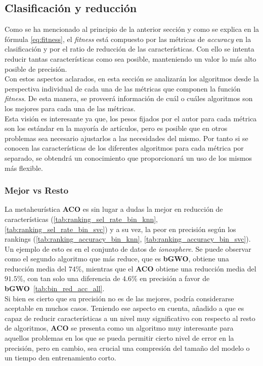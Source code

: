 \subsection{Clasificación y reducción}
Como se ha mencionado al principio de la anterior sección y como se explica en la fórmula \ref{eq:fitness}, el \textit{fitness} está compuesto por las métricas de \textit{accuracy} en la clasificación y por el ratio de reducción de las características. Con ello se intenta reducir tantas características como sea posible, manteniendo un valor lo más alto posible de precisión.\\[6pt]
Con estos aspectos aclarados, en esta sección se analizarán los algoritmos desde la perspectiva individual de cada una de las métricas que componen la función \textit{fitness}. De esta manera, se proveerá información de cuál o cuáles algoritmos son los mejores para cada una de las métricas.\\[6pt]
Esta visión es interesante ya que, los pesos fijados por el autor para cada métrica son los estándar en la mayoría de artículos, pero es posible que en otros problemas sea necesario ajustarlos a las necesidades del mismo. Por tanto si se conocen las características de los diferentes algoritmos para cada métrica por separado, se obtendrá un conocimiento que proporcionará un uso de los mismos más flexible.

\subsubsection{Mejor vs Resto}
La metaheurística \textbf{ACO} es sin lugar a dudas la mejor en reducción de características (\ref{tab:ranking_sel_rate_bin_knn}, \ref{tab:ranking_sel_rate_bin_svc}) y a su vez, la peor en precisión según los rankings (\ref{tab:ranking_accuracy_bin_knn}, \ref{tab:ranking_accuracy_bin_svc}).
Un ejemplo de esto es en el conjunto de datos de \textit{ionosphere}. Se puede observar como el segundo algoritmo que más reduce, que es \textbf{bGWO}, obtiene una reducción media del $74\%$, mientras que el \textbf{ACO} obtiene una reducción media del $91.5\%$, con tan solo una diferencia de $4.6\%$ en precisión a favor de \textbf{bGWO}~\ref{tab:bin_red_acc_all}. \\[6pt]
Si bien es cierto que su precisión no es de las mejores, podría considerarse aceptable en muchos casos. Teniendo ese aspecto en cuenta, añadido a que es capaz de reducir características a un nivel muy significativo con respecto al resto de algoritmos, \textbf{ACO} se presenta como un algoritmo muy interesante para aquellos problemas en los que se pueda permitir cierto nivel de error en la precisión, pero en cambio, sea crucial una compresión del tamaño del modelo o un tiempo den entrenamiento corto.\\[6pt]

